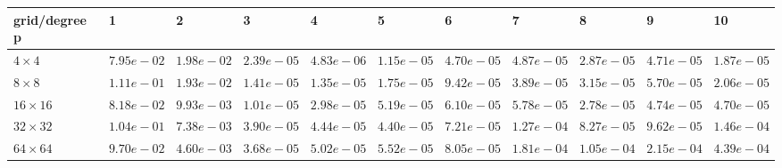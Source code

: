 \begin{tabular}{lllllllllll}
\hline
 grid/degree p   & 1          & 2          & 3          & 4          & 5          & 6          & 7          & 8          & 9          & 10         \\
\hline
 $4 \times 4$    & $7.95e-02$ & $1.98e-02$ & $2.39e-05$ & $4.83e-06$ & $1.15e-05$ & $4.70e-05$ & $4.87e-05$ & $2.87e-05$ & $4.71e-05$ & $1.87e-05$ \\
 $8 \times 8$    & $1.11e-01$ & $1.93e-02$ & $1.41e-05$ & $1.35e-05$ & $1.75e-05$ & $9.42e-05$ & $3.89e-05$ & $3.15e-05$ & $5.70e-05$ & $2.06e-05$ \\
 $16 \times 16$  & $8.18e-02$ & $9.93e-03$ & $1.01e-05$ & $2.98e-05$ & $5.19e-05$ & $6.10e-05$ & $5.78e-05$ & $2.78e-05$ & $4.74e-05$ & $4.70e-05$ \\
 $32 \times 32$  & $1.04e-01$ & $7.38e-03$ & $3.90e-05$ & $4.44e-05$ & $4.40e-05$ & $7.21e-05$ & $1.27e-04$ & $8.27e-05$ & $9.62e-05$ & $1.46e-04$ \\
 $64 \times 64$  & $9.70e-02$ & $4.60e-03$ & $3.68e-05$ & $5.02e-05$ & $5.52e-05$ & $8.05e-05$ & $1.81e-04$ & $1.05e-04$ & $2.15e-04$ & $4.39e-04$ \\
\hline
\end{tabular}